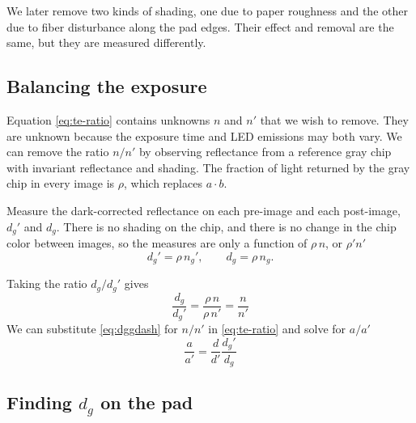 \documentclass[11pt,letter]{article}
\newcommand{\COMMENT}[1]{}
\begin{document}
We later remove two kinds of shading,  
one due to paper roughness and the other due to fiber disturbance along the pad edges.
Their effect and removal are the same, but they are measured differently.

\subsection{Balancing the exposure}

Equation \eqref{eq:te-ratio} contains unknowns $n$ and $n'$ that we wish to remove.
They are unknown because the exposure time and LED emissions may both vary.
We can remove the ratio $n/n'$ by observing reflectance from a reference gray chip with invariant reflectance and shading.
The fraction of light returned by the gray chip in every image is $\rho$, which replaces $a \cdot b$.

Measure the dark-corrected reflectance on each pre-image and each post-image, $d_g'$ and $d_g$.
There is no shading on the chip, and there is no change in the chip color between images, 
so the measures are only a function of $\rho \, n$, or $\rho' n'$
\begin{equation}
	d_g' = \rho\, n_g', \qquad d_g = \rho \, n_g .
\end{equation}
 
Taking the ratio $d_g / d_g'$ gives
\begin{equation}
	\frac{d_g}{d_g'} = \frac{\rho \, n}{\rho \, n'} = \frac{n}{n'}
	\label{eq:dggdash}
\end{equation}
We can substitute \eqref{eq:dggdash} for  $n / n'$ in \eqref{eq:te-ratio}
and solve for $a / a'$
\begin{equation}
	\frac{a}{a'} = \frac{d}{d'} \frac{d_g'}{d_g}
	\label{eq:daadash}
\end{equation}

\subsection{Finding $d_g$ on the pad}

\COMMENT{In this section I need to show clearly and simply how $P$ works to estimate $d_g'$ and $d_g$ during measurments.  I think I have to show the basic solution of $P$ during calibration, minimizing $d_g - P$ using least squares, and then how $P$ is used to extrapolate from the reference gray chips to the equivalent reference gray value at the pad during measurements.  I'd like to first show how that would work using a single gray reference chip with only a scalar multiplier on $P$, and then how it would work using multiple gray reference readings and linear or bilinear multiplier on $P$.  The difficulty is to show that the algebra is correct without getting too detailed. For example, I'd like to say that $P$ is found by minimizing $(P - d_g)^2$ over the area, and not show the matrix solution.  }
\end{document}
